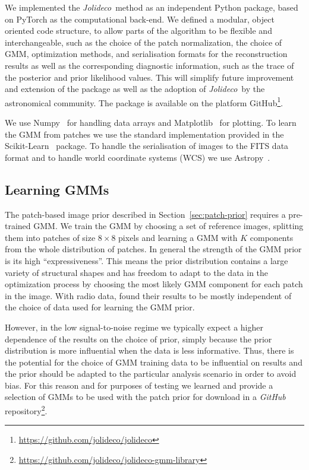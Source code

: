 \documentclass[twocolumn, linenumbers]{aastex631}
\newcommand{\jolideco}{\textit{Jolideco}~}
\begin{document}
    We implemented the \jolideco method as an independent Python package, based on PyTorch as the computational back-end.  We defined a modular, object oriented code structure, to allow parts of the algorithm to be flexible and interchangeable, such as the choice of the patch normalization, the choice of GMM, optimization methods, and serialisation formats for the reconstruction results as well as the corresponding diagnostic information, such as the trace of the posterior and prior likelihood values. This will simplify future improvement and extension of the package as well as the adoption of \jolideco by the astronomical community. The package is available on the platform GitHub\footnote{\url{https://github.com/jolideco/jolideco}}.

    We use Numpy~\citep{Numpy2020} for handling data arrays and Matplotlib~\citep{Hunter2007} for plotting. To learn the GMM from patches we use the standard implementation provided in the Scikit-Learn~\citep{scikit-learn} package. To handle the serialisation of images to the FITS data format and to handle world coordinate systems (WCS) we use Astropy~\citep{Astropy2018}.

    \subsection{Learning GMMs}
    \label{ssec:jolideco-gmm-library}
    The patch-based image prior described in Section~\ref{sec:patch-prior} requires a pre-trained GMM. We train the GMM by choosing a set of reference images, splitting them into patches of size $8\times8$ pixels and learning a GMM with $K$ components from the whole distribution of patches. In general the strength of the GMM prior is its high \enquote{expressiveness}. This means the prior distribution contains a large variety of structural shapes and has freedom to adapt to the data in the optimization process by choosing the most likely GMM component for each patch in the image. With radio data, \cite{Bouman2016} found their results to be mostly independent of the choice of data used for learning the GMM prior. 
    
    However, in the low signal-to-noise regime we typically expect a higher dependence of the results on the choice of prior, simply because the prior distribution is more influential when the data is less informative. Thus, there is the potential for the choice of GMM training data to be influential on results and the prior should be adapted to the particular analysis scenario in order to avoid bias. For this reason and for purposes of testing we learned and provide a selection of GMMs to be used with the patch prior for download in a \textit{GitHub} repository\footnote{\url{https://github.com/jolideco/jolideco-gmm-library}}. 
    
\end{document}
